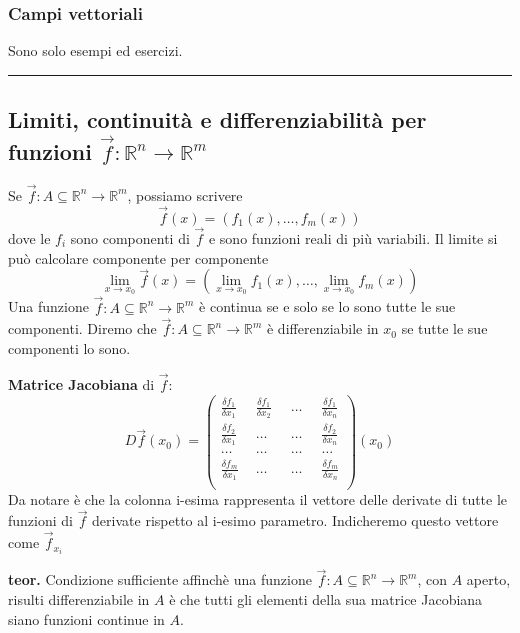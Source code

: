 \subsubsection{Campi vettoriali}
Sono solo esempi ed esercizi.\newline
\rule{\textwidth}{2pt}
\subsection{Limiti, continuità e differenziabilità per funzioni $\vec{f}:\mathbb{R}^n \rightarrow \mathbb{R}^m$}
Se $\vec{f} : A \subseteq \mathbb{R}^n \rightarrow  \mathbb{R}^m$, possiamo scrivere
\[
    \vec{f}(x) = (f_1(x), \dots,f_m(x))
\]
dove le $f_i$ sono componenti di $\vec{f}$ e sono funzioni reali di più variabili.\newline
\newline
Il limite si può calcolare componente per componente
\[
    \lim_{x\rightarrow x_0} \vec{f}(x) = (\lim_{x\rightarrow x_0}f_1(x), \dots,\lim_{x\rightarrow x_0}f_m(x))
\]
\newline
Una funzione $\vec{f} : A \subseteq \mathbb{R}^n \rightarrow  \mathbb{R}^m$ è continua se e solo se lo sono tutte le sue componenti.\newline
\newline
Diremo che $\vec{f} : A \subseteq \mathbb{R}^n \rightarrow  \mathbb{R}^m$ è differenziabile in $x_0$ se tutte le sue componenti lo sono.\newline
\newline
\begin{tcolorbox}
\textbf{Matrice Jacobiana} di $\vec{f}$:
\[
    D \vec{f}(x_0) = \left(\begin{matrix}
        \frac{\delta f_1}{\delta x_1} \;\; & \frac{\delta f_1}{\delta x_2} \;\; & \dots \;\; & \frac{\delta f_1}{\delta x_n}\\
        \frac{\delta f_2}{\delta x_1} & \dots & \dots & \frac{\delta f_2}{\delta x_n}\\
        \dots &\dots&\dots&\dots\\
        \frac{\delta f_m}{\delta x_1} & \dots & \dots & \frac{\delta f_m}{\delta x_n}\\
    \end{matrix}\right) (x_0)
\]
Da notare è che la colonna i-esima rappresenta il vettore delle derivate di tutte le funzioni di $\vec{f}$ derivate rispetto al i-esimo parametro. Indicheremo questo vettore come $\vec{f}_{x_i}$ 
\end{tcolorbox}
\textbf{teor.} Condizione sufficiente affinchè una funzione $\vec{f}: A \subseteq \mathbb{R}^n \rightarrow \mathbb{R}^m$, con $A$ aperto, risulti differenziabile in $A$ è che tutti gli elementi della sua matrice Jacobiana siano funzioni continue in $A$.\newline
